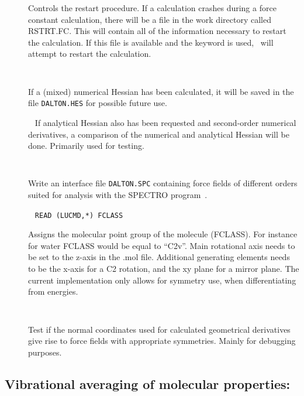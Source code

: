 \begin{description}
\item[]
Controls the restart procedure. If a calculation crashes during a
force constant calculation, there will be a file in the work directory
called RSTRT.FC. This will contain all of the information necessary to
restart the calculation. If this file is available and the keyword is
used, \dalton\ will attempt to restart the calculation.

\item[]\verb| |\newline

If a (mixed) numerical Hessian has been calculated, it will be saved
in the file \verb|DALTON.HES| for possible future use.

\item[]\verb| |\newline
If analytical Hessian also has been requested and second-order
numerical derivatives, a comparison of the numerical and analytical
Hessian will be done. Primarily used for testing.

\item[]\verb| |\newline

Write an interface file \verb|DALTON.SPC| containing force fields of
different orders suited for analysis with the SPECTRO
program~\cite{spectroref}.

\item[]\verb| |\newline
\verb|READ (LUCMD,*) FCLASS|

Assigns the molecular point group of the molecule (FCLASS). For
instance for water FCLASS would be equal to ``C2v''. Main rotational
axis needs to be set to the z-axis in the .mol file. Additional
generating elements needs to be the x-axis for a C2 rotation, and the
xy plane for a mirror plane. The current implementation only allows
for symmetry use, when differentiating from energies.

\item[]\verb| |\newline

Test if the normal coordinates used for calculated geometrical
derivatives give rise to force fields with appropriate
symmetries. Mainly for debugging purposes.

\end{description}

\subsection{Vibrational averaging of molecular properties: }
\label{sec:nmddrv.propan}

